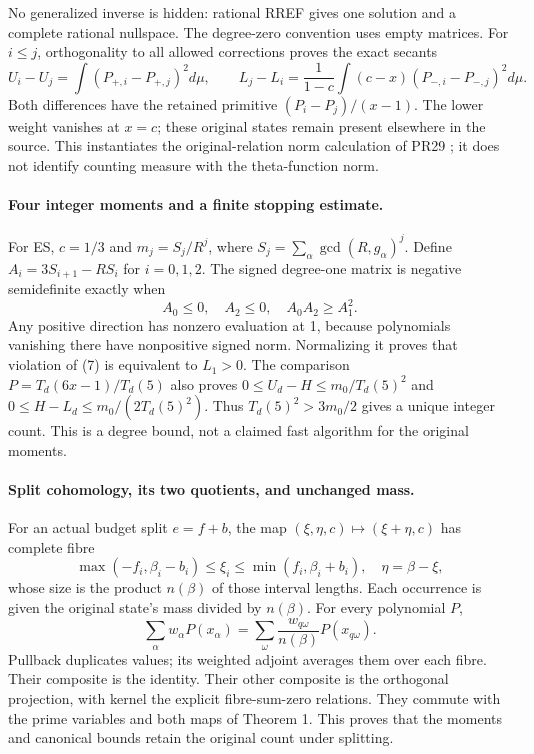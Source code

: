 \documentclass[10pt,a4paper]{article}
\begin{document}
No generalized inverse is hidden: rational RREF gives one solution and a
complete rational nullspace. The degree-zero convention uses empty matrices.
For $i\le j$, orthogonality to all allowed corrections proves the exact secants
\[
 U_i-U_j=\int(P_{+,i}-P_{+,j})^2d\mu,\qquad
 L_j-L_i=\frac1{1-c}\int(c-x)(P_{-,i}-P_{-,j})^2d\mu.
 \tag{6}
\]
Both differences have the retained primitive $(P_i-P_j)/(x-1)$.
The lower weight vanishes at $x=c$; these original states remain present
elsewhere in the source. This instantiates the original-relation norm
calculation of PR29 \cite[\S3--4]{SZ}; it does not identify counting measure
with the theta-function norm.

\paragraph{Four integer moments and a finite stopping estimate.}
For ES, $c=1/3$ and $m_j=S_j/R^j$, where
$S_j=\sum_\alpha\gcd(R,g_\alpha)^j$. Define
$A_i=3S_{i+1}-RS_i$ for $i=0,1,2$.
The signed degree-one matrix is negative semidefinite exactly when
\[
 A_0\le0,\quad A_2\le0,\quad A_0A_2\ge A_1^2.\tag{7}
\]
Any positive direction has nonzero evaluation at 1, because polynomials
vanishing there have nonpositive signed norm. Normalizing it proves that
violation of (7) is equivalent to $L_1>0$.
The comparison $P=T_d(6x-1)/T_d(5)$ also proves
$0\le U_d-H\le m_0/T_d(5)^2$ and
$0\le H-L_d\le m_0/(2T_d(5)^2)$.
Thus $T_d(5)^2>3m_0/2$ gives a unique integer count. This is a degree bound,
not a claimed fast algorithm for the original moments.

\newpage
\paragraph{Split cohomology, its two quotients, and unchanged mass.}
For an actual budget split $e=f+b$, the map $(\xi,\eta,c)\mapsto(\xi+\eta,c)$
has complete fibre
\[
 \max(-f_i,\beta_i-b_i)\le\xi_i\le\min(f_i,\beta_i+b_i),\quad
 \eta=\beta-\xi,
\]
whose size is the product $n(\beta)$ of those interval lengths.
Each occurrence is given the original state's mass divided by $n(\beta)$.
For every polynomial $P$,
\[
 \sum_\alpha w_\alpha P(x_\alpha)
 =\sum_\omega\frac{w_{q\omega}}{n(\beta)}P(x_{q\omega}).\tag{8}
\]
Pullback duplicates values; its weighted adjoint averages them over each
fibre. Their composite is the identity. Their other composite is the
orthogonal projection, with kernel the explicit fibre-sum-zero relations.
They commute with the prime variables and both maps of Theorem 1. This proves
that the moments and canonical bounds retain the original count under splitting.
\end{document}
